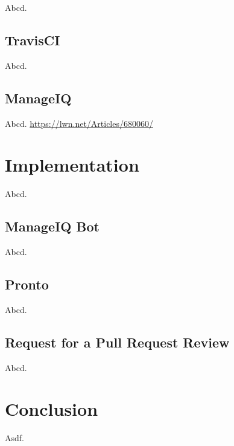Abcd.

\section{TravisCI}

Abcd.

\section{ManageIQ}

Abcd. \url{https://lwn.net/Articles/680060/}

\chapter{Implementation}

Abcd.

\section{ManageIQ Bot}

Abcd.

\section{Pronto}

Abcd.

\section{Request for a Pull Request Review}

Abcd.

\chapter{Conclusion}

Asdf.
